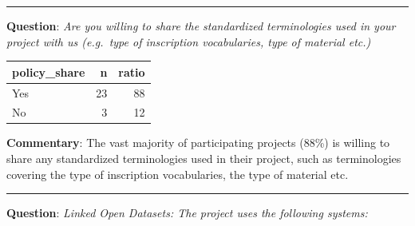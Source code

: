 \documentclass[
  12pt,
]{scrreprt}
\begin{document}
\begin{center}\rule{0.5\linewidth}{0.5pt}\end{center}

\textbf{Question}: \emph{Are you willing to share the standardized
terminologies used in your project with us (e.g.~type of inscription
vocabularies, type of material etc.)}

\footnotesize

\begin{longtable}[]{@{}lrr@{}}
\toprule
policy\_share & n & ratio \\
\midrule
\endhead
Yes & 23 & 88 \\
No & 3 & 12 \\
\bottomrule
\end{longtable}

\normalsize

\textbf{Commentary}: The vast majority of participating projects (88\%)
is willing to share any standardized terminologies used in their
project, such as terminologies covering the type of inscription
vocabularies, the type of material etc.

\begin{center}\rule{0.5\linewidth}{0.5pt}\end{center}

\textbf{Question}: \emph{Linked Open Datasets: The project uses the
following systems:}

\footnotesize
\end{document}
